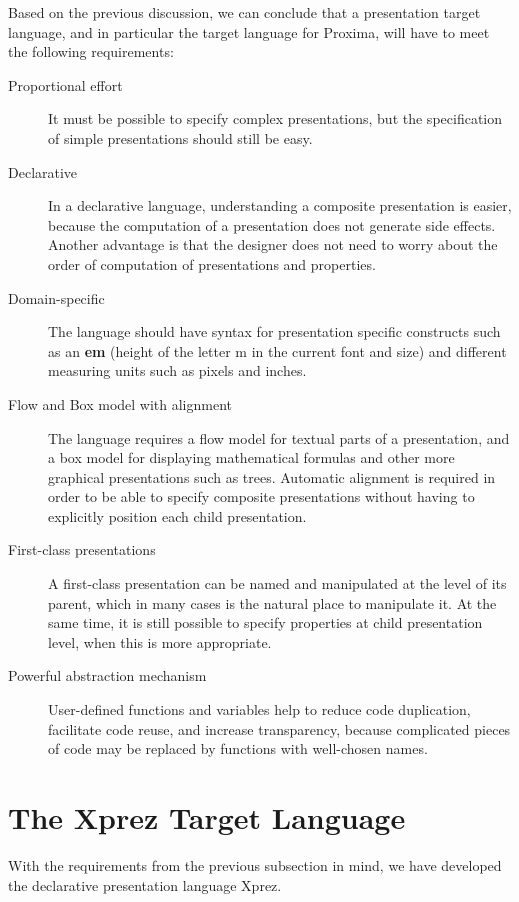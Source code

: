  Based on the previous discussion, we can conclude that a presentation target language, and in particular the target language for Proxima, will have to meet the following requirements: 

\begin{description}
\item[Proportional effort]
It must be possible to specify complex presentations, but the specification of simple presentations should still be easy.
\item[Declarative]
In a declarative language, understanding a composite presentation is easier, because the computation of a presentation does not generate side effects. Another advantage is that the designer does not need to worry about the order of computation of presentations and properties.
\item[Domain-specific]
The language should have syntax for presentation specific constructs such as an {\bf em} (height of the letter m in the current font and size) and different measuring units such as pixels and inches.
\item[Flow and Box model with alignment]
The language requires a flow model for textual parts of a presentation, and a box model for displaying mathematical formulas and other more graphical presentations such as trees. Automatic alignment is required in order to be able to specify composite presentations without having to explicitly position each child presentation.
\item[First-class presentations]
A first-class presentation can be named and manipulated at the level of its parent, which in many cases is the natural place to manipulate it. At the same time, it is still possible to specify properties at child presentation level, when this is more appropriate.
\item[Powerful abstraction mechanism]
User-defined functions and var\-i\-ables help to reduce code duplication, facilitate code reuse, and increase transparency, because complicated pieces of code may be replaced by functions with well-chosen names.
\end{description}


%									
%									
%									
\section{The {\sc Xprez} Target Language}
\label{xpreztarget}

With the requirements from the previous subsection in mind, we have developed the declarative presentation language {\sc Xprez}. 


